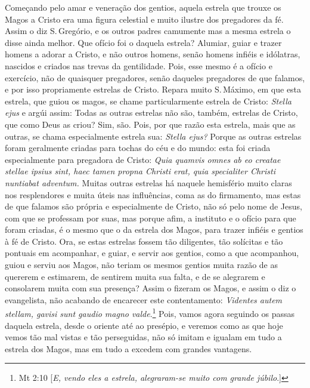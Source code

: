 Começando pelo amar e veneração dos gentios, aquela estrela que trouxe
os Magos a Cristo era uma figura celestial e muito ilustre dos
pregadores da fé. Assim o diz S.\,Gregório, e os outros padres camumente
mas a mesma estrela o disse ainda melhor. Que ofício foi o daquela
estrela? Alumiar, guiar e trazer homens a adorar a Cristo, e não outros
homens, senão homens infiéis e idólatras, nascidos e criados nas trevas
da gentilidade. Pois, esse mesmo é a ofício e exercício, não de
quaisquer pregadores, senão daqueles pregadores de que falamos, e por
isso propriamente estrelas de Cristo. Repara muito S.\,Máximo, em que
esta estrela, que guiou os magos, se chame particularmente estrela de
Cristo: \emph{Stella ejus} e argúi assim: Todas as outras estrelas não
são, também, estrelas de Cristo, que como Deus as criou? Sim, são. Pois,
por que razão esta estrela, mais que as outras, se chama especialmente
estrela sua: \emph{Stella ejus?} Porque as outras estrelas foram
geralmente criadas para tochas do céu e do mundo: esta foi criada
especialmente para pregadora de Cristo: \emph{Quia quamvis omnes ab eo
creatae stellae ipsius sint, haec tamen propna Christi erat, quia
specialiter Christi nuntiabat adventum.} Muitas outras estrelas há naquele hemisfério muito claras nos
resplendores e muita úteis nas influências, coma as do firmamento, mas
estas de que falamos são própria e especialmente de Cristo, não só pelo
nome de Jesus, com que se professam por suas, mas porque afim, a
instituto e o ofício para que foram criadas, é o mesmo que o da estrela
dos Magos, para trazer infiéis e gentios à fé de Cristo. Ora, se estas
estrelas fossem tão diligentes, tão solícitas e tão pontuais em
acompanhar, e guiar, e servir aos gentios, como a que acompanhou, guiou
e serviu aos Magos, não teriam os mesmos gentios muita razão de as
quererem e estimarem, de sentirem muita sua falta, e de se alegrarem e
consolarem muita com sua presença? Assim o fizeram os Magos, e assim o
diz o evangelista, não acabando de encarecer este contentamento:
\emph{Videntes autem stellam, gavisi sunt gaudio magno valde}.\footnote{Mt 2:10 [\emph{E, vendo eles a estrela, alegraram-se muito com grande júbilo}.]}
Pois, vamos agora seguindo os passas daquela estrela, desde
o oriente até ao presépio, e veremos como as que hoje vemos tão mal
vistas e tão perseguidas, não só imitam e igualam em tudo a estrela dos
Magos, mas em tudo a excedem com grandes vantagens.


